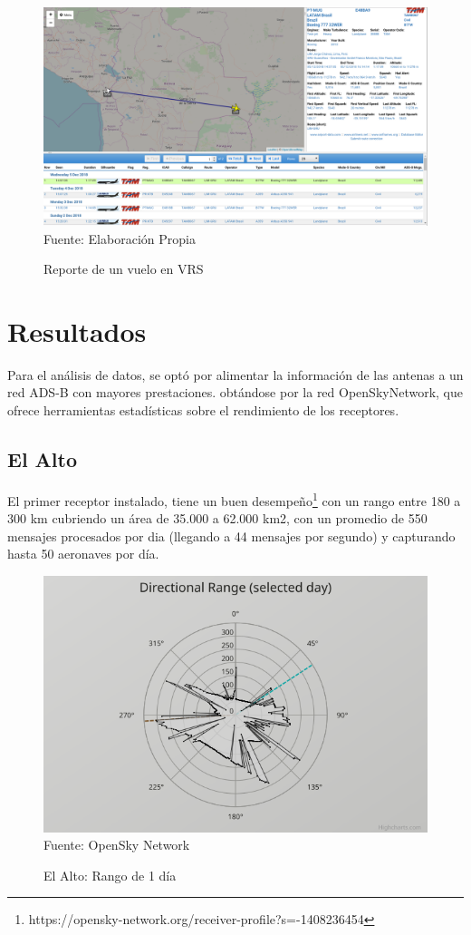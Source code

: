 \documentclass[fleqn,10pt]{SelfArx} %
\begin{document}
\begin{figure}[ht]
\caption{Reporte de un vuelo en VRS}
\centering
\includegraphics[width=0.9\linewidth]{reporte_vrs.png}
\newline Fuente: Elaboración Propia
\label{fig:reporte_vrs}
\end{figure}

\section{Resultados}

Para el análisis de datos, se optó por alimentar la información de las antenas a un red ADS-B con mayores prestaciones. obtándose por la red OpenSkyNetwork, que ofrece herramientas estadísticas sobre el rendimiento de los receptores.

\subsection*{El Alto}

El primer receptor instalado, tiene un buen desempeño\footnote{https://opensky-network.org/receiver-profile?s=-1408236454} con un rango entre 180 a 300 km cubriendo un área de 35.000 a 62.000 km2, con un promedio de 550 mensajes procesados por dia (llegando a 44 mensajes por segundo) y capturando hasta 50 aeronaves por día.

\begin{figure}[ht]
\caption{El Alto: Rango de 1 día}
\centering
\includegraphics[width=0.8\linewidth]{lpb_range.png}
\newline Fuente: OpenSky Network
\label{fig:lpb_range}
\end{figure}
\end{document}
